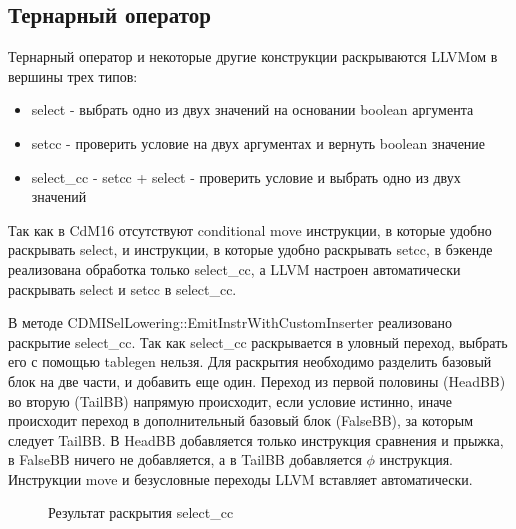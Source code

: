 \documentclass[a4paper,14pt]{extarticle}
\begin{document}
\subsection{Тернарный оператор}

Тернарный оператор и некоторые другие конструкции раскрываются LLVMом в вершины трех типов:
\begin{itemize}
	\item select - выбрать одно из двух значений на основании boolean аргумента
	\item setcc - проверить условие на двух аргументах и вернуть boolean значение
	\item select\_cc - setcc + select - проверить условие и выбрать одно из двух значений
\end{itemize}

Так как в CdM16 отсутствуют conditional move инструкции, в которые удобно раскрывать select, и инструкции, в которые удобно раскрывать setcc, в бэкенде реализована обработка только select\_cc, а LLVM настроен автоматически раскрывать select и setcc в select\_cc. 

В методе CDMISelLowering::EmitInstrWithCustomInserter реализовано раскрытие select\_cc. Так как select\_cc раскрывается в уловный переход, выбрать его с помощью tablegen нельзя. Для раскрытия необходимо разделить базовый блок на две части, и добавить еще один. Переход из первой половины (HeadBB) во вторую (TailBB) напрямую происходит, если условие истинно, иначе происходит переход в дополнительный базовый блок (FalseBB), за которым следует TailBB. В HeadBB добавляется только инструкция сравнения и прыжка, в FalseBB ничего не добавляется, а в TailBB добавляется  $\phi$ инструкция. Инструкции move и безусловные переходы LLVM вставляет автоматически.

\begin{figure}[h!]
	\begin{center}
		\caption{Результат раскрытия select\_cc}
	\end{center}
\end{figure}
\end{document}
